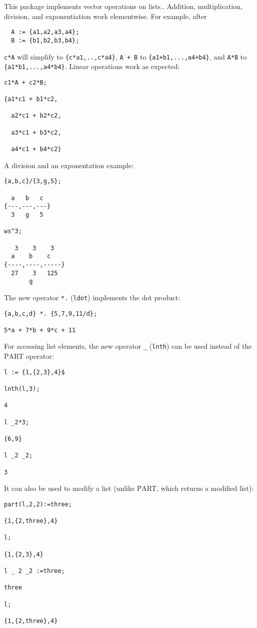 
This package implements vector operations on lists..
Addition, multiplication, division, and exponentiation work elementwise.
For example, after
\begin{verbatim}
  A := {a1,a2,a3,a4};
  B := {b1,b2,b3,b4};
\end{verbatim}
\texttt{c*A} will simplify to \texttt{\{c*a1,..,c*a4\}}, 
\texttt{A + B} to \texttt{\{a1+b1,...,a4+b4\}}, and
\texttt{A*B} to \texttt{\{a1*b1,...,a4*b4\}}.
Linear operations work as expected:
\begin{verbatim}
c1*A + c2*B;

{a1*c1 + b1*c2,

  a2*c1 + b2*c2,

  a3*c1 + b3*c2,

  a4*c1 + b4*c2}
\end{verbatim}
A division and an exponentation example:
\begin{verbatim}
{a,b,c}/{3,g,5};

  a   b   c
{---,---,---}
  3   g   5

ws^3;

   3    3    3
  a    b    c
{----,----,-----}
  27    3   125
       g
\end{verbatim}
The new operator \texttt{*.} (\texttt{ldot})
 implements
the dot product:
\begin{verbatim}
{a,b,c,d} *. {5,7,9,11/d};

5*a + 7*b + 9*c + 11
\end{verbatim}
For accessing list elements, the new operator \texttt{\_} (\texttt{lnth})
can be used instead of the \f{PART} operator:
\begin{verbatim}
l := {1,{2,3},4}$

lnth(l,3);

4

l _2*3;

{6,9}

l _2 _2;

3
\end{verbatim}
It can also be used to modify a list (unlike \f{PART}, which returns a modified list):
\begin{verbatim}
part(l,2,2):=three;

{1,{2,three},4}

l;

{1,{2,3},4}

l _ 2 _2 :=three;

three

l;

{1,{2,three},4}
\end{verbatim}
